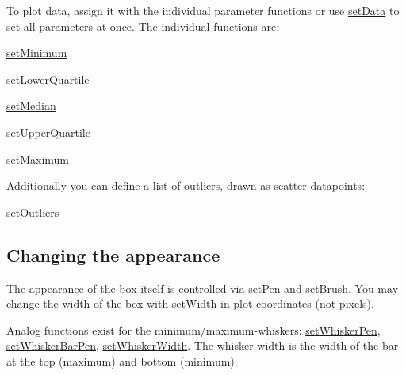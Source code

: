To plot data, assign it with the individual parameter functions or use \mbox{\hyperlink{class_q_c_p_statistical_box_adf50c57b635edb12470c0e4a986aff37}{set\+Data}} to set all parameters at once. The individual functions are\+: \begin{DoxyItemize}
\item \mbox{\hyperlink{class_q_c_p_statistical_box_a84ff7cc61ba44890f0c3e0c99c19941e}{set\+Minimum}} \item \mbox{\hyperlink{class_q_c_p_statistical_box_a680941af5e23d902013962fa67223f9e}{set\+Lower\+Quartile}} \item \mbox{\hyperlink{class_q_c_p_statistical_box_a65970e77a897da4ecb4b15300868aad3}{set\+Median}} \item \mbox{\hyperlink{class_q_c_p_statistical_box_a65a1375f941c5a2077b5201229e89346}{set\+Upper\+Quartile}} \item \mbox{\hyperlink{class_q_c_p_statistical_box_acec5ad1901f00f2c5387cfb4d9787eb3}{set\+Maximum}}\end{DoxyItemize}
Additionally you can define a list of outliers, drawn as scatter datapoints\+: \begin{DoxyItemize}
\item \mbox{\hyperlink{class_q_c_p_statistical_box_af9bc09620e0bf93bf444ee35e5800d1d}{set\+Outliers}}\end{DoxyItemize}
\hypertarget{class_q_c_p_statistical_box_appearance}{}\subsection{Changing the appearance}\label{class_q_c_p_statistical_box_appearance}
The appearance of the box itself is controlled via \mbox{\hyperlink{class_q_c_p_abstract_plottable_ab74b09ae4c0e7e13142fe4b5bf46cac7}{set\+Pen}} and \mbox{\hyperlink{class_q_c_p_abstract_plottable_a7a4b92144dca6453a1f0f210e27edc74}{set\+Brush}}. You may change the width of the box with \mbox{\hyperlink{class_q_c_p_statistical_box_a0b62775bd67301b1eba5c785f2b26f14}{set\+Width}} in plot coordinates (not pixels).

Analog functions exist for the minimum/maximum-\/whiskers\+: \mbox{\hyperlink{class_q_c_p_statistical_box_a4a5034cb3b9b040444df05ab1684620b}{set\+Whisker\+Pen}}, \mbox{\hyperlink{class_q_c_p_statistical_box_aa8d3e503897788e1abf68dc74b5f147f}{set\+Whisker\+Bar\+Pen}}, \mbox{\hyperlink{class_q_c_p_statistical_box_adf378812446bd66f34d1f7f293d991cd}{set\+Whisker\+Width}}. The whisker width is the width of the bar at the top (maximum) and bottom (minimum).

